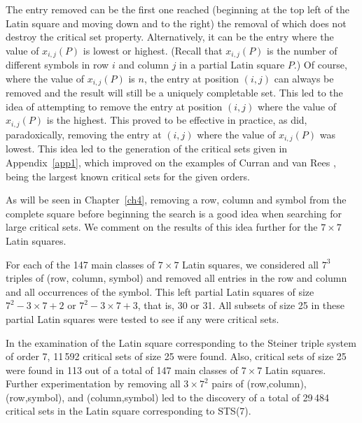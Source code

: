 \documentclass[12pt]{report}
\begin{document}
The entry removed can
be the first one reached (beginning at the top left of the Latin
square and moving down and to the right) the removal of which does not destroy
the critical set property.  Alternatively, it can be the entry where
the value of $x_{i,j}(P)$ is lowest or highest.  
(Recall that $x_{i,j}(P)$ is the number of different symbols in row $i$
and column $j$ in a partial Latin square $P$.)  Of course, where the value of $x_{i,j}(P)$ is $n$,
the entry at position $(i,j)$ can always be removed and the
result will still be a uniquely completable set.  This led to the
idea of attempting to remove the entry at position $(i,j)$ where
the value of $x_{i,j}(P)$ is the highest.  This proved to be effective
in practice, as did, paradoxically, removing the entry at $(i,j)$
where the value of $x_{i,j}(P)$ was lowest.  This idea led to the
generation of the critical sets given in Appendix~\ref{app1}, which improved
on the examples of Curran and van Rees \cite{MR80j:05022}, being the largest known
critical sets for the given orders.




As will be seen in Chapter~\ref{ch4}, removing a row, column and symbol from the
complete square before beginning the search is a good idea when searching
for large critical sets.  We comment on the results of this idea further
for the $7 \times 7$ Latin squares.

For each of the 147 main classes of $7 \times 7$ Latin squares, we 
considered all $7^3$ triples of (row, column, symbol) and removed
all entries in the row and column and all occurrences of the symbol.
This left partial Latin squares of size $7^2-3 \times 7+2$ or
$7^2-3 \times 7+3$, that is, 30 or 31.  All subsets of size 25 in
these partial Latin squares were tested to see if any were critical
sets.

In the examination of the Latin square corresponding to the Steiner
triple system of order 7, 11\,592 critical sets of size 25 were found.
Also, critical sets of size 25 were found in 113 out of a total of 147
main classes of $7 \times 7$ Latin squares.  Further experimentation
by removing all $3 \times 7^2$ pairs of (row,column), (row,symbol),
and (column,symbol) led to the discovery of a total of 29\,484 critical
sets in the Latin square corresponding to STS(7).
\end{document}
